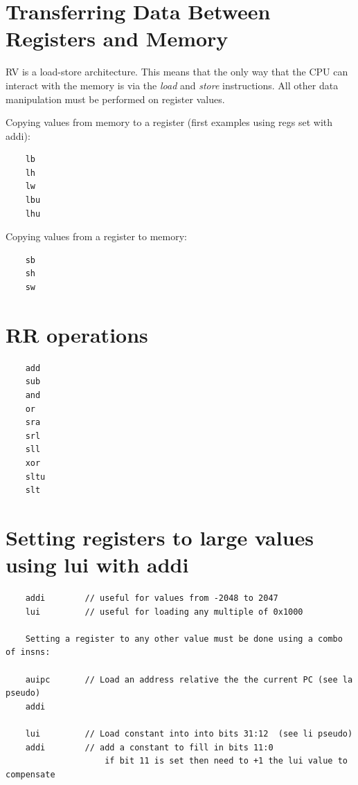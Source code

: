 \section{Transferring Data Between Registers and Memory}

RV is a load-store architecture.  This means that the only way that the
CPU can interact with the memory is via the {\em load} and {\em store}
instructions.  All other data manipulation must be performed on register
values.

Copying values from memory to a register (first examples using regs set with addi):
\label{uguide:lb}
\label{uguide:lh}
\label{uguide:lw}
\label{uguide:lbu}
\label{uguide:lhu}
{\small
\begin{verbatim}
    lb
    lh
    lw
    lbu
    lhu
\end{verbatim}
}

Copying values from a register to memory:
\label{uguide:sb}
\label{uguide:sh}
\label{uguide:sw}
{\small
\begin{verbatim}
    sb
    sh
    sw
\end{verbatim}
}

\section{RR operations}
\label{uguide:add}
\label{uguide:sub}
\label{uguide:and}
\label{uguide:or}
\label{uguide:sra}
\label{uguide:srl}
\label{uguide:sll}
\label{uguide:xor}
\label{uguide:sltu}
\label{uguide:slt}
{\small
\begin{verbatim}
    add
    sub
    and
    or
    sra
    srl
    sll
    xor
    sltu
    slt
\end{verbatim}
}


\section{Setting registers to large values using lui with addi}

\label{uguide:lui}
\label{uguide:auipc}
{\small
\begin{verbatim}
    addi        // useful for values from -2048 to 2047
    lui         // useful for loading any multiple of 0x1000

    Setting a register to any other value must be done using a combo of insns:

    auipc       // Load an address relative the the current PC (see la pseudo)
    addi

    lui         // Load constant into into bits 31:12  (see li pseudo)
    addi        // add a constant to fill in bits 11:0
                    if bit 11 is set then need to +1 the lui value to compensate
\end{verbatim}
}


